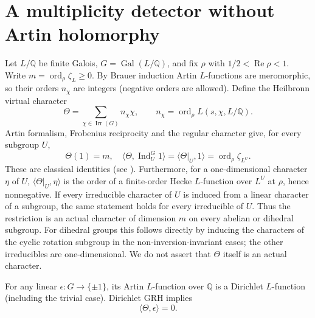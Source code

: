 \documentclass[11pt]{article}
\theoremstyle{remark}\newtheorem{remark}[theorem]{Remark}
\newcommand{\ord}{\operatorname{ord}}
\newcommand{\Rea}{\operatorname{Re}}
\newcommand{\Q}{\mathbb Q}
\begin{document}
\section{A multiplicity detector without Artin holomorphy}
Let $L/\Q$ be finite Galois, $G=\operatorname{Gal}(L/\Q)$, and fix $\rho$ with $1/2<\Rea\rho<1$. Write $m=\ord_\rho\zeta_L\ge0$. By Brauer induction Artin $L$-functions are meromorphic, so their orders $n_\chi$ are integers (negative orders are allowed). Define the Heilbronn virtual character
\[
 \Theta=\sum_{\chi\in\operatorname{Irr}(G)} n_\chi\chi,
 \qquad n_\chi=\ord_\rho L(s,\chi,L/\Q).
\]
Artin formalism, Frobenius reciprocity and the regular character give, for every subgroup $U$,
\begin{equation}\label{eq:orders}
 \Theta(1)=m,\quad
 \langle\Theta,\operatorname{Ind}_U^G1\rangle
 =\langle\Theta|_U,1\rangle=\ord_\rho\zeta_{L^U}.
\end{equation}
These are classical identities (see \cite{heilbronn,foote}). Furthermore, for a one-dimensional character $\eta$ of $U$, $\langle\Theta|_U,\eta\rangle$ is the order of a finite-order Hecke $L$-function over $L^U$ at $\rho$, hence nonnegative. If every irreducible character of $U$ is induced from a linear character of a subgroup, the same statement holds for every irreducible of $U$. Thus the restriction is an actual character of dimension $m$ on every abelian or dihedral subgroup. For dihedral groups this follows directly by inducing the characters of the cyclic rotation subgroup in the non-inversion-invariant cases; the other irreducibles are one-dimensional. We do not assert that $\Theta$ itself is an actual character.

For any linear $\epsilon:G\to\{\pm1\}$, its Artin $L$-function over $\Q$ is a Dirichlet $L$-function (including the trivial case). Dirichlet GRH implies
\begin{equation}\label{eq:signorth}
 \langle\Theta,\epsilon\rangle=0.
\end{equation}
\end{document}

